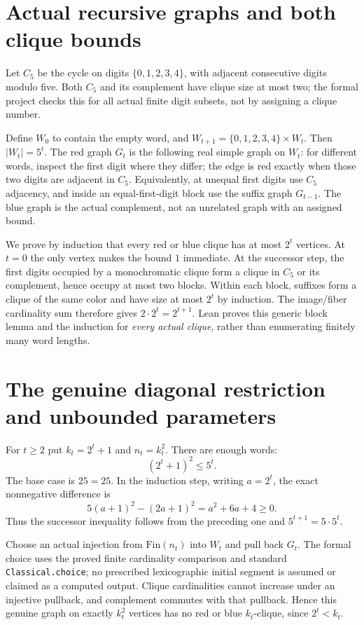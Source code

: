 \documentclass[10pt,a4paper]{article}
\begin{document}
\section{Actual recursive graphs and both clique bounds}
Let $C_5$ be the cycle on digits $\{0,1,2,3,4\}$, with adjacent consecutive digits modulo five.
Both $C_5$ and its complement have clique size at most two; the formal project checks this
for all actual finite digit subsets, not by assigning a clique number.

Define $W_0$ to contain the empty word, and $W_{t+1}=\{0,1,2,3,4\}\times W_t$.
Then $|W_t|=5^t$. The red graph $G_t$ is the following real simple graph on $W_t$:
for different words, inspect the first digit where they differ; the edge is red exactly
when those two digits are adjacent in $C_5$. Equivalently, at unequal first digits use
$C_5$ adjacency, and inside an equal-first-digit block use the suffix graph $G_{t-1}$.
The blue graph is the actual complement, not an unrelated graph with an assigned bound.

We prove by induction that every red or blue clique has at most $2^t$ vertices.
At $t=0$ the only vertex makes the bound $1$ immediate. At the successor step, the first
digits occupied by a monochromatic clique form a clique in $C_5$ or its complement, hence
occupy at most two blocks. Within each block, suffixes form a clique of the same color and
have size at most $2^t$ by induction. The image/fiber cardinality sum therefore gives
$2\cdot2^t=2^{t+1}$. Lean proves this generic block lemma and the induction for
\emph{every actual clique}, rather than enumerating finitely many word lengths.

\section{The genuine diagonal restriction and unbounded parameters}
For $t\ge2$ put $k_t=2^t+1$ and $n_t=k_t^2$. There are enough words:
\[
 (2^t+1)^2\le5^t.
\]
The base case is $25=25$. In the induction step, writing $a=2^t$, the exact nonnegative
difference is
\[
 5(a+1)^2-(2a+1)^2=a^2+6a+4\ge0.
\]
Thus the successor inequality follows from the preceding one and $5^{t+1}=5\cdot5^t$.

Choose an actual injection from $\mathrm{Fin}(n_t)$ into $W_t$ and pull back $G_t$.
The formal choice uses the proved finite cardinality comparison and standard
\texttt{Classical.choice}; no prescribed lexicographic initial segment is assumed or
claimed as a computed output. Clique cardinalities cannot increase under an injective
pullback, and complement commutes with that pullback. Hence this genuine graph on exactly
$k_t^2$ vertices has no red or blue $k_t$-clique, since $2^t<k_t$.
\end{document}
